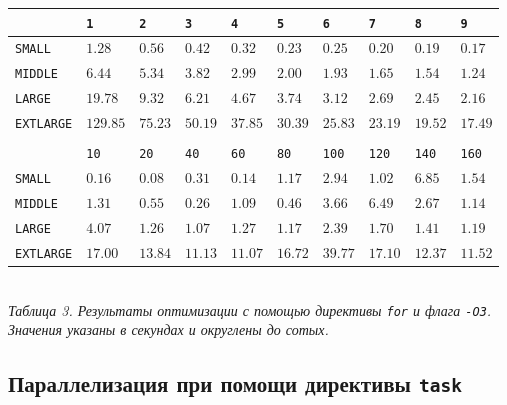 \documentclass[a4paper, 11pt]{article}
\begin{document}
\begin{center}
    \begin{tabular}{l | l l l l l l l l l}
        & \texttt{1} & \texttt{2} & \texttt{3} & \texttt{4} & \texttt{5} & \texttt{6} & \texttt{7} & \texttt{8} & \texttt{9} \\
        \hline
        \texttt{SMALL}    & $1.28$ & $0.56$ & $0.42$ & $0.32$ & $0.23$ & $0.25$ & $0.20$ & $0.19$ & $0.17$ \\
        \texttt{MIDDLE}   & $6.44$ & $5.34$ & $3.82$ & $2.99$ & $2.00$ & $1.93$ & $1.65$ & $1.54$ & $1.24$ \\
        \texttt{LARGE}    & $19.78$ & $9.32$ & $6.21$ & $4.67$ & $3.74$ & $3.12$ & $2.69$ & $2.45$ & $2.16$ \\
        \texttt{EXTLARGE} & $129.85$ & $75.23$ & $50.19$ & $37.85$ & $30.39$ & $25.83$ & $23.19$ & $19.52$ & $17.49$ \\
        \vspace{0.4cm}\\
        & \texttt{10} & \texttt{20} & \texttt{40} & \texttt{60} & \texttt{80} & \texttt{100} & \texttt{120} & \texttt{140} & \texttt{160} \\
        \hline
        \texttt{SMALL}    & $0.16$ & $0.08$ & $0.31$ & $0.14$ & $1.17$ & $2.94$ & $1.02$ & $6.85$ & $1.54$ \\
        \texttt{MIDDLE}   & $1.31$ & $0.55$ & $0.26$ & $1.09$ & $0.46$ & $3.66$ & $6.49$ & $2.67$ & $1.14$ \\
        \texttt{LARGE}    & $4.07$ & $1.26$ & $1.07$ & $1.27$ & $1.17$ & $2.39$ & $1.70$ & $1.41$ & $1.19$ \\
        \texttt{EXTLARGE} & $17.00$ & $13.84$ & $11.13$ & $11.07$ & $16.72$ & $39.77$ & $17.10$ & $12.37$ & $11.52$ \\
    \end{tabular}\\
    \vspace{0.3cm}
    \small \it
    Таблица 3. Результаты оптимизации с помощью директивы \texttt{for} и флага \texttt{-O3}. Значения указаны в секундах и округлены до сотых.
\end{center}
\newpage

\subsection*{Параллелизация при помощи директивы \texttt{task}}
\end{document}

